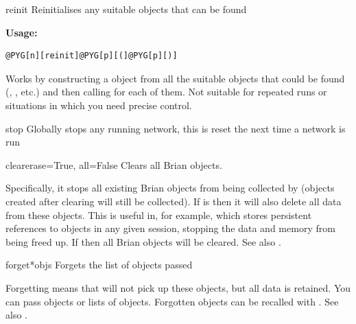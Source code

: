 \documentclass[letterpaper,10pt,english]{manual}
\begin{document}
\hypertarget{brian.reinit}{}\begin{funcdesc}{reinit}{}
Reinitialises any suitable objects that can be found

\textbf{Usage:}

\begin{Verbatim}[commandchars=@\[\]]
@PYG[n][reinit]@PYG[p][(]@PYG[p][)]
\end{Verbatim}

Works by constructing a \hyperlink{brian.MagicNetwork}{} object from all the suitable
objects that could be found (\hyperlink{brian.NeuronGroup}{}, \hyperlink{brian.Connection}{}, etc.) and
then calling  for each of them. Not suitable for repeated
runs or situations in which you need precise control.
\end{funcdesc}

\hypertarget{brian.stop}{}\begin{funcdesc}{stop}{}
Globally stops any running network, this is reset the next time a network is run
\end{funcdesc}

\hypertarget{brian.clear}{}\begin{funcdesc}{clear}{erase=True, all=False}
Clears all Brian objects.

Specifically, it stops all existing Brian objects from being collected by
\hyperlink{brian.MagicNetwork}{} (objects created after clearing will still be collected).
If  is  then it will also delete all data from these objects.
This is useful in, for example,  which stores persistent references
to objects in any given session, stopping the data and memory from being freed
up.  If  then all Brian objects will be cleared. See also
\hyperlink{brian.forget}{}.
\end{funcdesc}

\hypertarget{brian.forget}{}\begin{funcdesc}{forget}{*objs}
Forgets the list of objects passed

Forgetting means that \hyperlink{brian.MagicNetwork}{} will not pick up these objects,
but all data is retained. You can pass objects or lists of objects. Forgotten
objects can be recalled with \hyperlink{brian.recall}{}. See also \hyperlink{brian.clear}{}.
\end{funcdesc}
\end{document}
